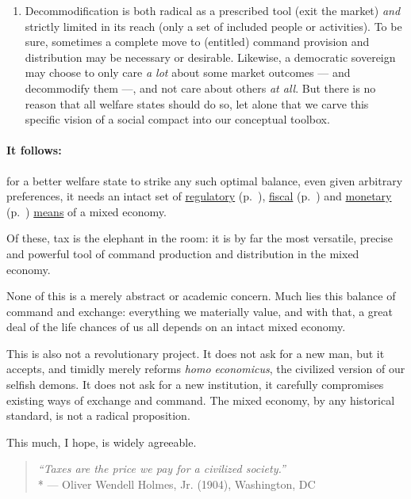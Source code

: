 \begin{description}
\begin{enumerate}
		\item Decommodification is both radical as a prescribed tool (exit the market) \emph{and} strictly limited in its reach (only a set of included people or activities). To be sure, sometimes a complete move to (entitled) command provision and distribution may be necessary or desirable. Likewise, a democratic sovereign may choose to only care \emph{a lot} about some market outcomes --- and decommodify them ---, and not care about others \emph{at all}. But there is no reason that all welfare states should do so, let alone that we carve this specific vision of a social compact into our conceptual toolbox.
	\end{enumerate}
\end{description} 

\paragraph{It follows:} for a better welfare state to strike any such optimal balance, even given arbitrary preferences, it needs an intact set of \hyperref[sec:regulatory]{regulatory} (p.~\pageref{sec:regulatory}), \hyperref[sec:fiscal] {fiscal} (p.~\pageref{sec:fiscal}) and \hyperref[sec:monetary]{monetary} (p.~\pageref{sec:monetary}) \hyperref[sec:means]{means} of a mixed economy. %

Of these, tax is the elephant in the room: it is by far the most versatile, precise and powerful tool of command production and distribution in the mixed economy.

None of this is a merely abstract or academic concern. Much lies this balance of command and exchange: everything we materially value, and with that, a great deal of the life chances of us all depends on an intact mixed economy.

This is also not a revolutionary project. It does not ask for a new man, but it accepts, and timidly merely reforms \emph{homo economicus}, the civilized version of our selfish demons. It does not ask for a new institution, it carefully compromises existing ways of exchange and command. The mixed economy, by any historical standard, is not a radical proposition. 

This much, I hope, is widely agreeable.



\begin{quote}
	\emph{``Taxes are the price we pay for a civilized society.''}\\*
	--- Oliver Wendell Holmes, Jr. (1904), Washington, DC
\end{quote}

